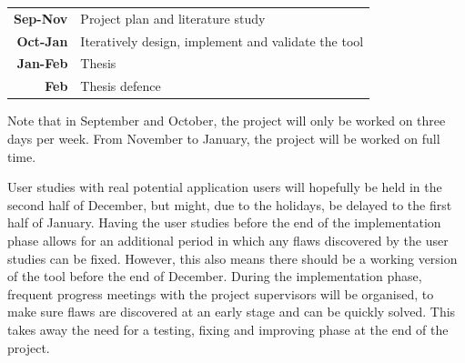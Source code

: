 \noindent
\begin{tabular}{r|l}
\textbf{Sep-Nov} & Project plan and literature study\\
\textbf{Oct-Jan} & Iteratively design, implement and validate the tool\\
\textbf{Jan-Feb} & Thesis\\
\textbf{Feb} & Thesis defence
\end{tabular}

\noindent
Note that in September and October, the project will only be worked on three days per week. From November to January, the project will be worked on full time.

User studies with real potential application users will hopefully be held in the second half of December, but might, due to the holidays, be delayed to the first half of January. Having the user studies before the end of the implementation phase allows for an additional period in which any flaws discovered by the user studies can be fixed. However, this also means there should be a working version of the tool before the end of December. During the implementation phase, frequent progress meetings with the project supervisors will be organised, to make sure flaws are discovered at an early stage and can be quickly solved. This takes away the need for a testing, fixing and improving phase at the end of the project.

